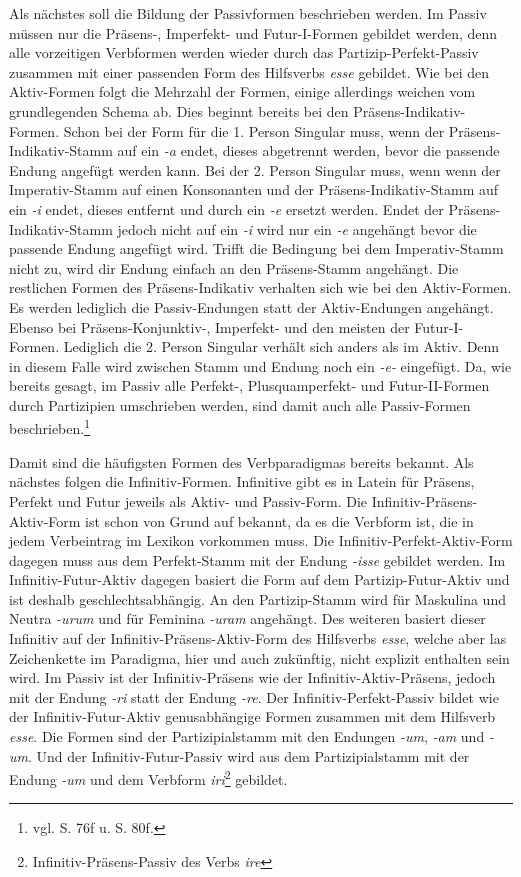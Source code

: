 Als nächstes soll die Bildung der Passivformen beschrieben werden. Im Passiv müssen nur die Präsens-, Imperfekt- und Futur-I-Formen gebildet werden, denn alle vorzeitigen Verbformen werden wieder durch das Partizip-Perfekt-Passiv zusammen mit einer passenden Form des Hilfsverbs \textit{esse} gebildet. Wie bei den Aktiv-Formen folgt die Mehrzahl der Formen, einige allerdings weichen vom grundlegenden Schema ab. Dies beginnt bereits bei den Präsens-Indikativ-Formen. Schon bei der Form für die 1. Person Singular muss, wenn der Präsens-Indikativ-Stamm auf ein \textit{-a} endet, dieses abgetrennt werden, bevor die passende Endung angefügt werden kann. Bei der 2. Person Singular muss, wenn wenn der Imperativ-Stamm auf einen Konsonanten und der Präsens-Indikativ-Stamm auf ein \textit{-i} endet, dieses entfernt und durch ein \textit{-e} ersetzt werden. Endet der Präsens-Indikativ-Stamm jedoch nicht auf ein \textit{-i} wird nur ein \textit{-e} angehängt bevor die passende Endung angefügt wird. Trifft die Bedingung bei dem Imperativ-Stamm nicht zu, wird dir Endung einfach an den Präsens-Stamm angehängt. Die restlichen Formen des Präsens-Indikativ verhalten sich wie bei den Aktiv-Formen. Es werden lediglich die Passiv-Endungen statt der Aktiv-Endungen angehängt. Ebenso bei Präsens-Konjunktiv-, Imperfekt- und den meisten der Futur-I-Formen. Lediglich die 2. Person Singular verhält sich anders als im Aktiv. Denn in diesem Falle wird zwischen Stamm und Endung noch ein \textit{-e-} eingefügt. Da, wie bereits gesagt, im Passiv alle Perfekt-, Plusquamperfekt- und Futur-II-Formen durch Partizipien umschrieben werden, sind damit auch alle Passiv-Formen beschrieben.\footnote{vgl. \cite{BAYER-LINDAUER1994} S. 76f u. S. 80f.} \par
Damit sind die häufigsten Formen des Verbparadigmas bereits bekannt. Als nächstes folgen die Infinitiv-Formen. Infinitive gibt es in Latein für Präsens, Perfekt und Futur jeweils als Aktiv- und Passiv-Form. Die Infinitiv-Präsens-Aktiv-Form ist schon von Grund auf bekannt, da es die Verbform ist, die in jedem Verbeintrag im Lexikon vorkommen muss. Die Infinitiv-Perfekt-Aktiv-Form dagegen muss aus dem Perfekt-Stamm mit der Endung \textit{-isse} gebildet werden. Im Infinitiv-Futur-Aktiv dagegen basiert die Form auf dem Partizip-Futur-Aktiv und ist deshalb geschlechtsabhängig. An den Partizip-Stamm wird für Maskulina und Neutra \textit{-urum} und für Feminina \textit{-uram} angehängt. Des weiteren basiert dieser Infinitiv auf der Infinitiv-Präsens-Aktiv-Form des Hilfsverbs \textit{esse}, welche aber las Zeichenkette im Paradigma, hier und auch zukünftig, nicht explizit enthalten sein wird. Im Passiv ist der Infinitiv-Präsens wie der Infinitiv-Aktiv-Präsens, jedoch mit der Endung \textit{-ri} statt der Endung \textit{-re}. Der Infinitiv-Perfekt-Passiv bildet wie der Infinitiv-Futur-Aktiv genusabhängige Formen zusammen mit dem Hilfsverb \textit{esse}. Die Formen sind der Partizipialstamm mit den Endungen \textit{-um}, \textit{-am} und \textit{-um}. Und der Infinitiv-Futur-Passiv wird aus dem Partizipialstamm mit der Endung \textit{-um} und dem Verbform \textit{iri}\footnote{Infinitiv-Präsens-Passiv des Verbs \textit{ire}} gebildet.\par
